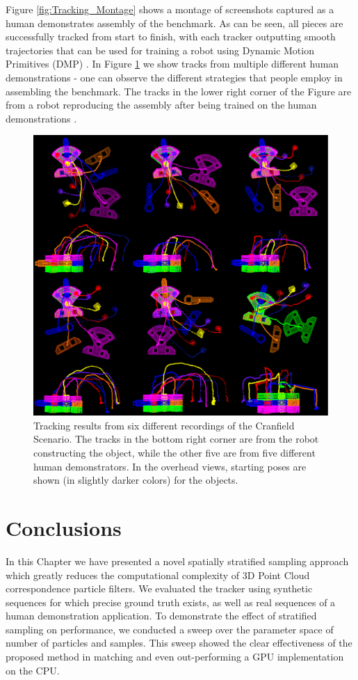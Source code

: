 Figure \ref{fig:Tracking_Montage} shows a montage of screenshots captured as a human demonstrates assembly of the benchmark. As can be seen, all pieces are successfully tracked from start to finish, with each tracker outputting smooth trajectories that can be used for training a robot using Dynamic Motion Primitives (DMP) \cite{Kulvicius2012}. In Figure \ref{fig:TrackingResults} we show tracks from multiple different human demonstrations - one can observe the different strategies that people employ in assembling the benchmark. The tracks in the lower right corner of the Figure are from a robot reproducing the assembly after being trained on the human demonstrations \cite{Rossman_ICRA2014}. 

\begin{figure}[!ht]
  \centering
  \includegraphics[width=1.0\textwidth]{figures/Tracking/TracksMontage.pdf}
  \caption[Snapshots from Virtual Reality Benchmark Run]{Tracking results from six different recordings of the Cranfield Scenario. The tracks in the bottom right corner are from the robot constructing the object, while the other five are from five different human demonstrators. In the overhead views, starting poses are shown (in slightly darker colors) for the objects.}
  \label{fig:TrackingResults}
\end{figure}

\section{Conclusions}
In this Chapter we have presented a novel spatially stratified sampling approach which greatly reduces the computational complexity of 3D Point Cloud correspondence particle filters. We evaluated the tracker using synthetic sequences for which precise ground truth exists, as well as real sequences of a human demonstration application. To demonstrate the effect of stratified sampling on performance, we conducted a sweep over the parameter space of number of particles and samples. This sweep showed the clear effectiveness of the proposed method in matching and even out-performing a GPU implementation on the CPU. 


